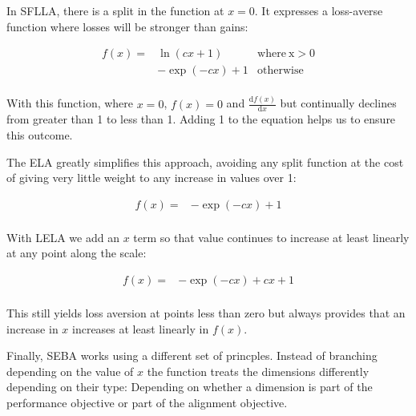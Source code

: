 


In SFLLA, there is a split in the function at $x=0$. It expresses a loss-averse function where losses will be stronger than gains:

\begin{align}
f(x)= & \ln(cx+1) & \mathrm{ where \: x>0} \\ \nonumber
  &  -\exp(-cx)+1 &  \mathrm{otherwise} \\ \nonumber
\end{align}

With this function, where $x=0$, $f(x)=0$ and $\frac{\mathrm{d} f(x) }{\mathrm{d} x}$ but continually declines from greater than 1 to less than 1. Adding 1 to the equation helps us to ensure this outcome.

The ELA greatly simplifies this approach, avoiding any split function at the cost of giving very little weight to any increase in values over 1:

\begin{align}
f(x)= &  -\exp(-cx)+1 \\ \nonumber
\end{align}

With LELA we add an $x$ term so that value continues to increase at least linearly at any point along the scale:


\begin{align}
f(x)= &  -\exp(-cx)+cx+1 \\ \nonumber
\end{align}

This still yields loss aversion at points less than zero but always provides that an increase in $x$ increases at least linearly in $f(x)$.


Finally, SEBA works using a different set of princples. Instead of branching depending on the value of $x$ the function treats the dimensions differently depending on their type: Depending on whether a dimension is part of the performance objective or part of the alignment objective.

